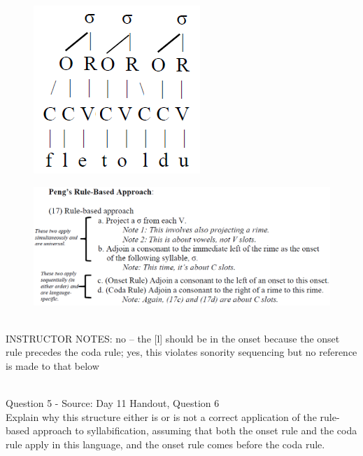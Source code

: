 \documentclass[12pt]{article}
\begin{document}
\begin{figure}[H]
\includegraphics{../images/pengrules_fletoldu_no.png}
\end{figure}
\begin{figure}[H]
\includegraphics{../images/peng_rules.png}
\end{figure}

~\\
INSTRUCTOR NOTES: no -- the [l] should be in the onset because the onset rule precedes the coda rule; yes, this violates sonority sequencing but no reference is made to that below


~\\

{\large Question 5} - Source: Day 11 Handout, Question 6\\

Explain why this structure either is or is not a correct application of the rule-based approach to syllabification, assuming that both the onset rule and the coda rule apply in this language, and the onset rule comes before the coda rule.\\
\end{document}
